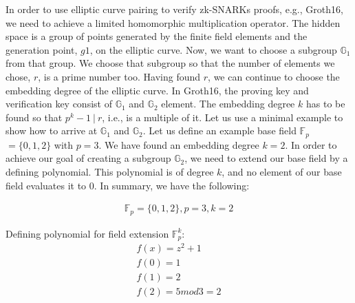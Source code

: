 In order to use elliptic curve pairing to verify zk-SNARKs proofs, e.g., Groth16, we need to achieve a limited homomorphic multiplication operator. The hidden space is a group of points generated by the finite field elements and the generation point, \(g1\), on the elliptic curve. Now, we want to choose a subgroup \begin{math} \mathbb{G}_1\end{math} from that group. We choose that subgroup so that the number of elements we chose, \(r\), is a prime number too. Having found \(r\), we can continue to choose the embedding degree of the elliptic curve. In Groth16, the proving key and verification key consist of \begin{math} \mathbb{G}_1\end{math} and \begin{math} \mathbb{G}_2\end{math} element. The embedding degree \(k\) has to be found so that \(p^k-1\ |\ r\), i.e., is a multiple of it. Let us use a minimal example to show how to arrive at \begin{math} \mathbb{G}_1\end{math} and \begin{math} \mathbb{G}_2\end{math}.
Let us define an example base field \begin{math}\mathbb{F}_p\end{math} \(= \{0,1,2\}\) with \(p = 3\). We have found an embedding degree \(k=2\). In order to achieve our goal of creating a subgroup \begin{math} \mathbb{G}_2\end{math}, we need to extend our base field by a defining polynomial. This polynomial is of degree \(k\), and no element of our base field evaluates it to 0. In summary, we have the following:

\begin{align}
    \mathbb{F}_p = \{0,1,2\}, p = 3, k = 2
\end{align}

Defining polynomial for field extension \begin{math}\mathbb{F}_p^k\end{math}: 
\begin{align*}
    f(x) = z^2 +1 \\
    f(0) = 1\\
    f(1) = 2\\
    f(2) = 5 mod 3 = 2
\end{align*}

